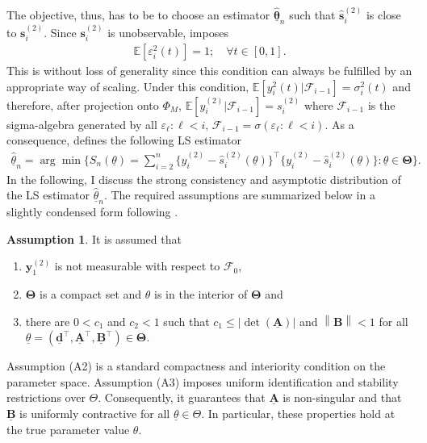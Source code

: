 \documentclass[12pt,a4paper]{article}
\theoremstyle{definition}
\newtheorem{assumption}{Assumption}[section]
\begin{document}
The objective, thus, has to be to choose an estimator $\mathbf{\underline{\hat{\theta}}}_n$ such that $\mathbf{\hat{s}}_i^{(2)}$ is close to $\mathbf{s}_i^{(2)}$. Since $\mathbf{s}_i^{(2)}$ is unobservable, \citet{Aue2017} imposes
\begin{gather}
\label{UnitVarianceepsilonfunction}
    \mathbb{E}[\varepsilon_i^2(t)]=1; \quad \forall t\in[0,1].
\end{gather}
This is without loss of generality since this condition can always be fulfilled by an appropriate way of scaling. Under this condition, $\mathbb{E}[y_i^{2}(t)|\mathcal{F}_{i-1}]=\sigma_i^{2}(t)$ and therefore, after projection onto $\Phi_M$, $\mathbb{E}[y_i^{(2)}|\mathcal{F}_{i-1}]=s_i^{(2)}$ where $\mathcal{F}_{i-1}$ is the sigma-algebra generated by all $\varepsilon_\ell:\ell<i$, $\mathcal{F}_{i-1}=\sigma(\varepsilon_\ell:\ell<i)$. As a consequence, \citet{Aue2017} defines the following LS estimator
\begin{align}
\label{ObjectiveFunctionLSFGARCH}
    \underline{\hat{\theta}}_n=\arg \min\{S_n(\underline{\theta})=\sum_{i=2}^n\{y_i^{(2)}-\hat{s}_i^{(2)}(\underline{\theta}) \}^{\top}\{y_i^{(2)}-\hat{s}_i^{(2)}(\underline{\theta}) \}:\underline{\theta}\in\mathbf{\Theta}\}.
\end{align}
In the following, I discuss the strong consistency and asymptotic distribution of the LS estimator $\underline{\hat{\theta}}_n$. The required assumptions are summarized below in a slightly condensed form following \citet{Aue2017}.
\begin{assumption}
\label{Assumption1}
    It is assumed that
    \begin{enumerate}[label=(A\arabic*)]
        \item $\mathbf{y}_1^{(2)}$ is not measurable with respect to $\mathcal{F}_0$,
        \item $\mathbf{\Theta}$ is a compact set and $\theta$ is in the interior of $\mathbf{\Theta}$ and
        \item there are $0<c_1$ and $c_2<1$ such that $c_1\leq \left|\det(\underline{\mathbf{A}})\right|$ and $\left\| \mathbf{B} \right\|<1$ for all $\underline{\theta}=(\underline{\mathbf{d}}^\top,\underline{\mathbf{A}}^\top,\underline{\mathbf{B}}^\top)\in\mathbf{\Theta}$.
        \label{Ainvertibility}
    \end{enumerate}
\end{assumption}
Assumption (A2) is a standard compactness and interiority condition on the parameter space. Assumption (A3) imposes uniform identification and stability restrictions over $\Theta$. Consequently, it guarantees that $\underline{\mathbf{A}}$ is non-singular and that $\underline{\mathbf{B}}$ is uniformly contractive for all $\underline{\theta}\in \Theta$. In particular, these properties hold at the true parameter value $\theta$.
\end{document}
